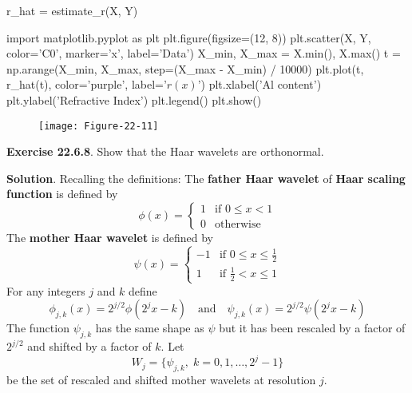 \begin{python}
r_hat = estimate_r(X, Y)
\end{python}

\begin{python}
import matplotlib.pyplot as plt
plt.figure(figsize=(12, 8))
plt.scatter(X, Y, color='C0', marker='x', label='Data')
X_min, X_max = X.min(), X.max()
t = np.arange(X_min, X_max, step=(X_max - X_min) / 10000)
plt.plot(t, r_hat(t), color='purple', label='$\hat{r}(x)$')
plt.xlabel('Al content')
plt.ylabel('Refractive Index')
plt.legend()
plt.show()
\end{python}

\begin{figure}[H]
\centering
\texttt{[image: Figure-22-11]}
\end{figure}


\textbf{Exercise 22.6.8}. Show that the Haar wavelets are orthonormal.

\textbf{Solution}.
Recalling the definitions:
The \textbf{father Haar wavelet} of \textbf{Haar scaling function} is
defined by
\[
\phi(x) = \begin{cases}
1 & \text{if } 0 \leq x < 1 \\
0 & \text{otherwise}
\end{cases}
\]
The \textbf{mother Haar wavelet} is defined by
\[
\psi(x) = \begin{cases}
-1 & \text{if } 0 \leq x \leq \frac{1}{2} \\
1  & \text{if } \frac{1}{2} < x \leq 1
\end{cases}
\]
For any integers \(j\) and \(k\) define
\[
\phi_{j, k}(x) = 2^{j/2} \phi(2^{j} x - k) 
\quad \text{and} \quad
\psi_{j, k}(x) = 2^{j/2} \psi(2^{j} x - k)
\]
The function \(\psi_{j, k}\) has the same shape as \(\psi\) but it has
been rescaled by a factor of \(2^{j/2}\) and shifted by a factor of
\(k\).
Let
\[
W_{j} = \{\psi_{j, k}, \; k = 0, 1, \dots, 2^{j} - 1\}
\]
be the set of rescaled and shifted mother wavelets at resolution \(j\).

